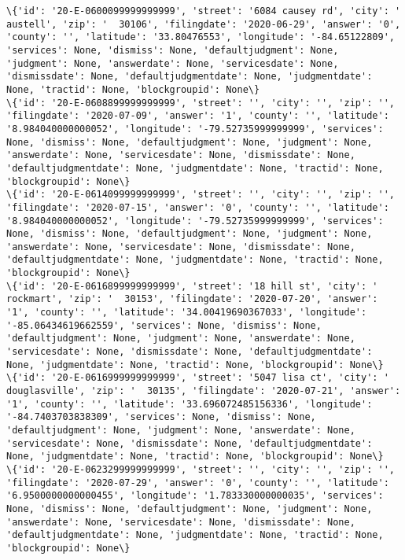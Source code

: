 \documentclass[11pt]{article}
\begin{document}
\begin{Verbatim}[commandchars=\\\{\}]
\{'id': '20-E-0600099999999999', 'street': '6084 causey rd', 'city': '  austell', 'zip': '  30106', 'filingdate': '2020-06-29', 'answer': '0', 'county': '', 'latitude': '33.80476553', 'longitude': '-84.65122809', 'services': None, 'dismiss': None, 'defaultjudgment': None, 'judgment': None, 'answerdate': None, 'servicesdate': None, 'dismissdate': None, 'defaultjudgmentdate': None, 'judgmentdate': None, 'tractid': None, 'blockgroupid': None\}
\{'id': '20-E-0608899999999999', 'street': '', 'city': '', 'zip': '', 'filingdate': '2020-07-09', 'answer': '1', 'county': '', 'latitude': '8.984040000000052', 'longitude': '-79.52735999999999', 'services': None, 'dismiss': None, 'defaultjudgment': None, 'judgment': None, 'answerdate': None, 'servicesdate': None, 'dismissdate': None, 'defaultjudgmentdate': None, 'judgmentdate': None, 'tractid': None, 'blockgroupid': None\}
\{'id': '20-E-0614099999999999', 'street': '', 'city': '', 'zip': '', 'filingdate': '2020-07-15', 'answer': '0', 'county': '', 'latitude': '8.984040000000052', 'longitude': '-79.52735999999999', 'services': None, 'dismiss': None, 'defaultjudgment': None, 'judgment': None, 'answerdate': None, 'servicesdate': None, 'dismissdate': None, 'defaultjudgmentdate': None, 'judgmentdate': None, 'tractid': None, 'blockgroupid': None\}
\{'id': '20-E-0616899999999999', 'street': '18 hill st', 'city': '  rockmart', 'zip': '  30153', 'filingdate': '2020-07-20', 'answer': '1', 'county': '', 'latitude': '34.00419690367033', 'longitude': '-85.06434619662559', 'services': None, 'dismiss': None, 'defaultjudgment': None, 'judgment': None, 'answerdate': None, 'servicesdate': None, 'dismissdate': None, 'defaultjudgmentdate': None, 'judgmentdate': None, 'tractid': None, 'blockgroupid': None\}
\{'id': '20-E-0616999999999999', 'street': '5047 lisa ct', 'city': '  douglasville', 'zip': '  30135', 'filingdate': '2020-07-21', 'answer': '1', 'county': '', 'latitude': '33.696072485156336', 'longitude': '-84.7403703838309', 'services': None, 'dismiss': None, 'defaultjudgment': None, 'judgment': None, 'answerdate': None, 'servicesdate': None, 'dismissdate': None, 'defaultjudgmentdate': None, 'judgmentdate': None, 'tractid': None, 'blockgroupid': None\}
\{'id': '20-E-0623299999999999', 'street': '', 'city': '', 'zip': '', 'filingdate': '2020-07-29', 'answer': '0', 'county': '', 'latitude': '6.9500000000000455', 'longitude': '1.783330000000035', 'services': None, 'dismiss': None, 'defaultjudgment': None, 'judgment': None, 'answerdate': None, 'servicesdate': None, 'dismissdate': None, 'defaultjudgmentdate': None, 'judgmentdate': None, 'tractid': None, 'blockgroupid': None\}

\end{Verbatim}
\end{document}
